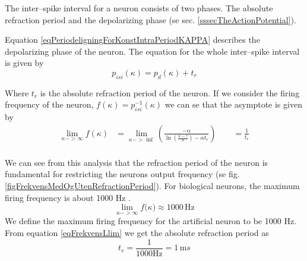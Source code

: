 
The inter--spike interval for a neuron consists of two phases. 
The absolute refraction period and the depolarizing phase (se sec. \ref{sssecTheActionPotential}).

Equation \eqref{eqPeriodeligningForKonstIntraPeriodKAPPA} describes the depolarizing phase of the neuron. %
The equation for the whole inter--spike interval is given by
\begin{equation}
	p_{isi}(\kappa) = p_d(\kappa) + t_r
\end{equation}

Where $t_r$ is the absolute refraction period of the neuron. %
If we consider the firing frequency of the neuron, $f(\kappa) = p_{isi}^{-1}(\kappa)$ we can se that the asymptote is given by
\begin{equation}
	\begin{split}
		\lim_{\kappa->\infty}{ f(\kappa)} &= \lim_{\kappa->\inf}\left( \frac{-\alpha}{\ln \left( \frac{\kappa - \tau}{\kappa} \right) - \alpha t_r} \right)   \qquad = \frac{1}{t_r} \\ 
	\end{split}
\end{equation}




We can see from this analysis that the refraction period of the neuron is fundamental for restricting the neurons output frequency (se fig. \ref{figFrekvensMedOgUtenRefractionPeriod}).
For biological neurons, the maximum firing frequency is about 1000 Hz \cite{NeuroscienceExploringTheBrain3edKAP4}. %
\begin{equation}
	\lim_{\kappa->\infty}{ f(\kappa}) \approx 1000 \, \text{Hz}
\end{equation}
We define the maximum firing frequency for the artificial neuron to be 1000 Hz. From equation \ref{eqFrekvensLlim} we get the absolute refraction period as
\begin{equation}
	t_r = \frac{1}{1000 \text{Hz}} = 1 \, \text{m}s %
\end{equation}


